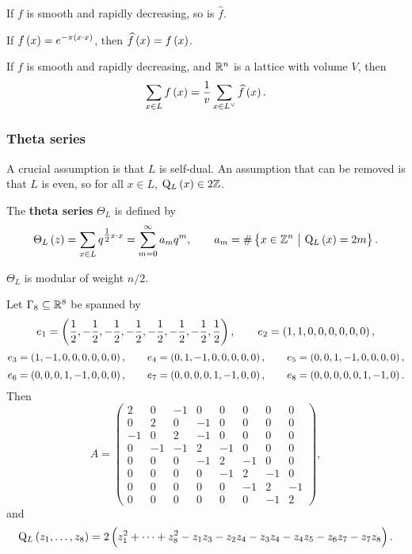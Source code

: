 \begin{fact*}
If $ f $ is smooth and rapidly decreasing, so is $ \widehat{f} $.
\end{fact*}

\begin{fact*}
If $ f\br{x} = e^{-\pi\br{x \cdot x}} $, then $ \widehat{f}\br{x} = f\br{x} $.
\end{fact*}

\begin{fact*}
If $ f $ is smooth and rapidly decreasing, and $ \mathbb{R}^n $ is a lattice with volume $ V $, then
$$ \sum_{x \in L} f\br{x} = \dfrac{1}{v}\sum_{x \in L^\vee} \widehat{f}\br{x}. $$
\end{fact*}

\subsubsection{Theta series}

A crucial assumption is that $ L $ is self-dual. An assumption that can be removed is that $ L $ is even, so for all $ x \in L $, $ \Q_L\br{x} \in 2\ZZ $.

\begin{definition}
The \textbf{theta series} $ \Theta_L $ is defined by
$$ \Theta_L\br{z} = \sum_{x \in L} q^{\tfrac{1}{2}x \cdot x} = \sum_{m = 0}^\infty a_mq^m, \qquad a_m = \#\cbr{x \in \ZZ^n \st \Q_L\br{x} = 2m}. $$
\end{definition}

\begin{theorem}
\label{thm:thetaseries}
$ \Theta_L $ is modular of weight $ n / 2 $.
\end{theorem}

\begin{example*}
Let $ \Gamma_8 \subseteq \mathbb{R}^8 $ be spanned by
$$ e_1 = \br{\dfrac{1}{2}, -\dfrac{1}{2}, -\dfrac{1}{2}, -\dfrac{1}{2}, -\dfrac{1}{2}, -\dfrac{1}{2}, -\dfrac{1}{2}, \dfrac{1}{2}}, \qquad e_2 = \br{1, 1, 0, 0, 0, 0, 0, 0}, $$
$$ e_3 = \br{1, -1, 0, 0, 0, 0, 0, 0}, \qquad e_4 = \br{0, 1, -1, 0, 0, 0, 0, 0}, \qquad e_5 = \br{0, 0, 1, -1, 0, 0, 0, 0}, $$
$$ e_6 = \br{0, 0, 0, 1, -1, 0, 0, 0}, \qquad e_7 = \br{0, 0, 0, 0, 1, -1, 0, 0}, \qquad e_8 = \br{0, 0, 0, 0, 0, 1, -1, 0}. $$
Then
$$ A =
\begin{pmatrix}
2 & 0 & -1 & 0 & 0 & 0 & 0 & 0 \\
0 & 2 & 0 & -1 & 0 & 0 & 0 & 0 \\
-1 & 0 & 2 & -1 & 0 & 0 & 0 & 0 \\
0 & -1 & -1 & 2 & -1 & 0 & 0 & 0 \\
0 & 0 & 0 & -1 & 2 & -1 & 0 & 0 \\
0 & 0 & 0 & 0 & -1 & 2 & -1 & 0 \\
0 & 0 & 0 & 0 & 0 & -1 & 2 & -1 \\
0 & 0 & 0 & 0 & 0 & 0 & -1 & 2
\end{pmatrix},
$$
and
$$ \Q_L\br{z_1, \dots, z_8} = 2\br{z_1^2 + \dots + z_8^2 - z_1z_3 - z_2z_4 - z_3z_4 - z_4z_5 - z_6z_7 - z_7z_8}. $$
\end{example*}

